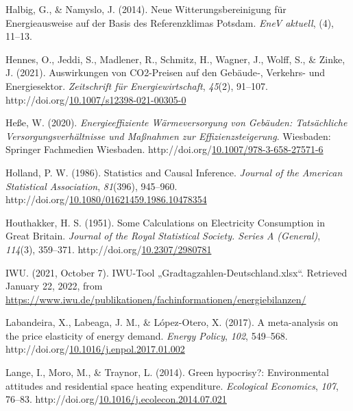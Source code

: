 \documentclass[12pt,twoside]{reedthesis}
\newlength{\cslhangindent}
\newenvironment{CSLReferences}[2] %
 {%
  \setlength{\parindent}{0pt}
  \ifodd #1 \everypar{\setlength{\hangindent}{\cslhangindent}}\ignorespaces\fi
  \ifnum #2 > 0
  \setlength{\parskip}{#2\baselineskip}
  \fi
 }%
 {}
\begin{document}
\begin{CSLReferences}{1}{0}
\leavevmode{}%
Halbig, G., \& Namyslo, J. (2014). Neue Witterungsbereinigung für Energieausweise auf der Basis des Referenzklimas Potsdam. \emph{EneV aktuell}, (4), 11--13.

\leavevmode{}%
Hennes, O., Jeddi, S., Madlener, R., Schmitz, H., Wagner, J., Wolff, S., \& Zinke, J. (2021). Auswirkungen von CO2-Preisen auf den Gebäude‑, Verkehrs- und Energiesektor. \emph{Zeitschrift für Energiewirtschaft}, \emph{45}(2), 91--107. http://doi.org/\href{https://doi.org/10.1007/s12398-021-00305-0}{10.1007/s12398-021-00305-0}

\leavevmode{}%
Heße, W. (2020). \emph{Energieeffiziente Wärmeversorgung von Gebäuden: Tatsächliche Versorgungsverhältnisse und Maßnahmen zur Effizienzsteigerung}. Wiesbaden: Springer Fachmedien Wiesbaden. http://doi.org/\href{https://doi.org/10.1007/978-3-658-27571-6}{10.1007/978-3-658-27571-6}

\leavevmode{}%
Holland, P. W. (1986). Statistics and Causal Inference. \emph{Journal of the American Statistical Association}, \emph{81}(396), 945--960. http://doi.org/\href{https://doi.org/10.1080/01621459.1986.10478354}{10.1080/01621459.1986.10478354}

\leavevmode{}%
Houthakker, H. S. (1951). Some Calculations on Electricity Consumption in Great Britain. \emph{Journal of the Royal Statistical Society. Series A (General)}, \emph{114}(3), 359--371. http://doi.org/\href{https://doi.org/10.2307/2980781}{10.2307/2980781}

\leavevmode{}%
IWU. (2021, October 7). IWU-Tool „Gradtagzahlen-Deutschland.xlsx``. Retrieved January 22, 2022, from \url{https://www.iwu.de/publikationen/fachinformationen/energiebilanzen/}

\leavevmode{}%
Labandeira, X., Labeaga, J. M., \& López-Otero, X. (2017). A meta-analysis on the price elasticity of energy demand. \emph{Energy Policy}, \emph{102}, 549--568. http://doi.org/\href{https://doi.org/10.1016/j.enpol.2017.01.002}{10.1016/j.enpol.2017.01.002}

\leavevmode{}%
Lange, I., Moro, M., \& Traynor, L. (2014). Green hypocrisy?: Environmental attitudes and residential space heating expenditure. \emph{Ecological Economics}, \emph{107}, 76--83. http://doi.org/\href{https://doi.org/10.1016/j.ecolecon.2014.07.021}{10.1016/j.ecolecon.2014.07.021}


\end{CSLReferences}
\end{document}

